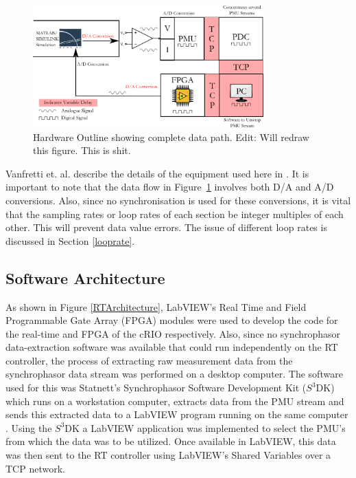 \documentclass[journal]{IEEEtran}
\begin{document}
\begin{figure}[!h]
\centering
\includegraphics[width=3.5in]{DataFlow.png} 
\caption{Hardware Outline showing complete data path. Edit: Will redraw this figure. This is shit.}
\label{Hardware_Outline}
\end{figure}

Vanfretti et. al. describe the details of the equipment used here in \cite{PhasorPODImplement}. It is important to note that the data flow in Figure~\ref{Hardware_Outline} involves both D/A and A/D conversions. Also, since no synchronisation is used for these conversions, it is vital that the sampling rates or loop rates of each section be integer multiples of each other. This will prevent data value errors. The issue of different loop rates is discussed in Section \ref{looprate}.


\subsection{Software Architecture}
As shown in Figure \ref{RTArchitecture}, LabVIEW's Real Time and Field Programmable Gate Array (FPGA) modules were used to develop the code for the real-time and FPGA of the cRIO respectively. Also, since no synchrophasor data-extraction software was available that could run independently on the RT controller, the process of extracting raw measurement data from the synchrophasor data stream was performed on a desktop computer. The software used for this was Statnett\rq{s} Synchrophasor Software Development Kit ($S^{3}$DK) \cite{SDK} which runs on a workstation computer, extracts data from the PMU stream and sends this extracted data to a LabVIEW program running on the same computer \cite{SDK}. Using the $S^{3}$DK a LabVIEW application was implemented to select the PMU\rq{s} from which the data was to be utilized. Once available in LabVIEW, this data was then sent to the RT controller using LabVIEW\rq{s} Shared Variables \cite{LabViewManuals} over a TCP network.
\end{document}
